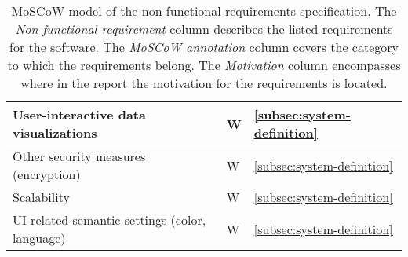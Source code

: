 \begin{table}[H]
\begin{tabularx}{\textwidth}{ l X X }
        User-interactive data visualizations
        & W
        & {\ul{\ref{subsec:system-definition}}}
        \\ \midrule
        Other security measures (encryption)
        & W
        & {\ul{\ref{subsec:system-definition}}}
        \\ \midrule
        Scalability
        & W
        & {\ul{\ref{subsec:system-definition}}}
        \\ \midrule
        UI related semantic settings (color, language)
        & W
        & {\ul{\ref{subsec:system-definition}}}
        \\ \bottomrule
    \end{tabularx}
    \caption{MoSCoW model of the non-functional requirements specification.
    The \textit{Non-functional requirement} column describes the listed requirements for the software.
    The \textit{MoSCoW annotation} column covers the category to which the requirements belong.
    The \textit{Motivation} column encompasses where in the report the motivation for the requirements is located.
    }\label{tab:non-functional-requirements-specification}
\end{table}
